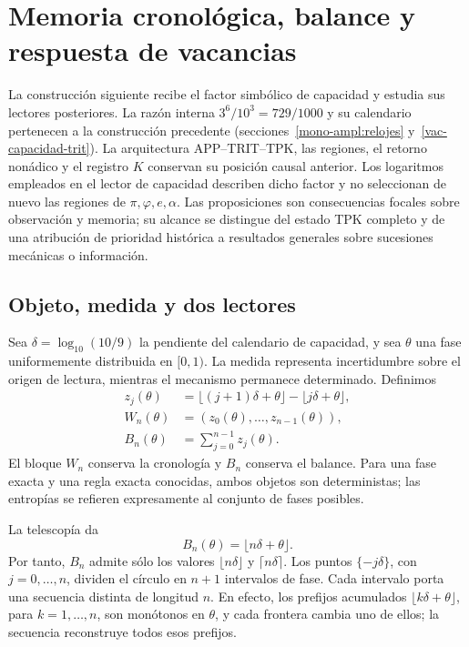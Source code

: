 \section{Memoria cronológica, balance y respuesta de vacancias}
\label{md:cron:seccion}

La construcción siguiente recibe el factor simbólico de capacidad y estudia
sus lectores posteriores. La razón interna $3^6/10^3=729/1000$ y su
calendario pertenecen a la construcción precedente
(secciones~\ref{mono-ampl:relojes} y~\ref{vac-capacidad-trit}).
La arquitectura APP--TRIT--TPK, las regiones, el retorno nonádico y el
registro $K$ conservan su posición causal anterior. Los logaritmos empleados
en el lector de capacidad describen dicho factor y no seleccionan de nuevo
las regiones de $\pi,\varphi,e,\alpha$.
Las proposiciones son consecuencias focales sobre observación y memoria;
su alcance se distingue del estado TPK completo y de una atribución de
prioridad histórica a resultados generales sobre sucesiones mecánicas o
información.

\subsection{Objeto, medida y dos lectores}
\label{md:cron:lectores}

Sea $\delta=\log_{10}(10/9)$ la pendiente del calendario de capacidad,
y sea $\theta$ una fase uniformemente distribuida en $[0,1)$.
La medida representa incertidumbre sobre el origen de lectura, mientras el
mecanismo permanece determinado. Definimos
\begin{equation}
 \begin{aligned}
 z_j(\theta)&=\lfloor(j+1)\delta+\theta\rfloor
             -\lfloor j\delta+\theta\rfloor,\\
 W_n(\theta)&=(z_0(\theta),\ldots,z_{n-1}(\theta)),\\
 B_n(\theta)&=\sum_{j=0}^{n-1}z_j(\theta).
 \end{aligned}
 \label{md:cron:dos-lectores}
\end{equation}
El bloque $W_n$ conserva la cronología y $B_n$ conserva el balance.
Para una fase exacta y una regla exacta conocidas, ambos objetos son
deterministas; las entropías se refieren expresamente al conjunto de fases
posibles.

La telescopía da
\begin{equation}
 B_n(\theta)=\lfloor n\delta+\theta\rfloor.
 \label{md:cron:telescopia}
\end{equation}
Por tanto, $B_n$ admite sólo los valores $\lfloor n\delta\rfloor$ y
$\lceil n\delta\rceil$. Los puntos $\{-j\delta\}$, con $j=0,\ldots,n$,
dividen el círculo en $n+1$ intervalos de fase. Cada intervalo porta una
secuencia distinta de longitud $n$. En efecto, los prefijos acumulados
$\lfloor k\delta+\theta\rfloor$, para $k=1,\ldots,n$, son monótonos en
$\theta$, y cada frontera cambia uno de ellos; la secuencia reconstruye
todos esos prefijos.

